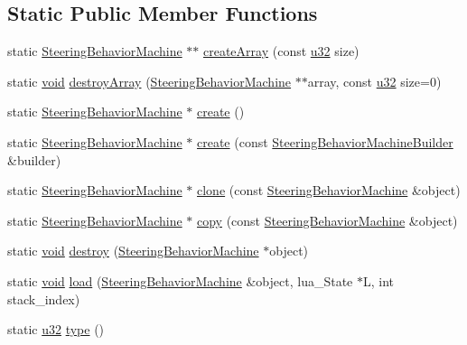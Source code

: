 \subsection*{Static Public Member Functions}
\begin{DoxyCompactItemize}
\item 
static \mbox{\hyperlink{classnjli_1_1_steering_behavior_machine}{Steering\+Behavior\+Machine}} $\ast$$\ast$ \mbox{\hyperlink{classnjli_1_1_steering_behavior_machine_af97628764337e956f6c6ffe1d21eff30}{create\+Array}} (const \mbox{\hyperlink{_util_8h_a10e94b422ef0c20dcdec20d31a1f5049}{u32}} size)
\item 
static \mbox{\hyperlink{_thread_8h_af1e856da2e658414cb2456cb6f7ebc66}{void}} \mbox{\hyperlink{classnjli_1_1_steering_behavior_machine_a9cf768db1c04513184ada83d420af23e}{destroy\+Array}} (\mbox{\hyperlink{classnjli_1_1_steering_behavior_machine}{Steering\+Behavior\+Machine}} $\ast$$\ast$array, const \mbox{\hyperlink{_util_8h_a10e94b422ef0c20dcdec20d31a1f5049}{u32}} size=0)
\item 
static \mbox{\hyperlink{classnjli_1_1_steering_behavior_machine}{Steering\+Behavior\+Machine}} $\ast$ \mbox{\hyperlink{classnjli_1_1_steering_behavior_machine_ab8fe4150d2324d83d50a413d35d16ae2}{create}} ()
\item 
static \mbox{\hyperlink{classnjli_1_1_steering_behavior_machine}{Steering\+Behavior\+Machine}} $\ast$ \mbox{\hyperlink{classnjli_1_1_steering_behavior_machine_a8c449bcdcb6b82b7258ad5e418d6c430}{create}} (const \mbox{\hyperlink{classnjli_1_1_steering_behavior_machine_builder}{Steering\+Behavior\+Machine\+Builder}} \&builder)
\item 
static \mbox{\hyperlink{classnjli_1_1_steering_behavior_machine}{Steering\+Behavior\+Machine}} $\ast$ \mbox{\hyperlink{classnjli_1_1_steering_behavior_machine_a2f36fb5b2930a51164b442b399b2e414}{clone}} (const \mbox{\hyperlink{classnjli_1_1_steering_behavior_machine}{Steering\+Behavior\+Machine}} \&object)
\item 
static \mbox{\hyperlink{classnjli_1_1_steering_behavior_machine}{Steering\+Behavior\+Machine}} $\ast$ \mbox{\hyperlink{classnjli_1_1_steering_behavior_machine_a63326be519b9ee6d77687f90c6304697}{copy}} (const \mbox{\hyperlink{classnjli_1_1_steering_behavior_machine}{Steering\+Behavior\+Machine}} \&object)
\item 
static \mbox{\hyperlink{_thread_8h_af1e856da2e658414cb2456cb6f7ebc66}{void}} \mbox{\hyperlink{classnjli_1_1_steering_behavior_machine_a7e50f455b9d1a543c98bcb463f312647}{destroy}} (\mbox{\hyperlink{classnjli_1_1_steering_behavior_machine}{Steering\+Behavior\+Machine}} $\ast$object)
\item 
static \mbox{\hyperlink{_thread_8h_af1e856da2e658414cb2456cb6f7ebc66}{void}} \mbox{\hyperlink{classnjli_1_1_steering_behavior_machine_a3826fef1020cad7acb80436f7c9a71bd}{load}} (\mbox{\hyperlink{classnjli_1_1_steering_behavior_machine}{Steering\+Behavior\+Machine}} \&object, lua\+\_\+\+State $\ast$L, int stack\+\_\+index)
\item 
static \mbox{\hyperlink{_util_8h_a10e94b422ef0c20dcdec20d31a1f5049}{u32}} \mbox{\hyperlink{classnjli_1_1_steering_behavior_machine_ab193f59f5f0a3ba81703678bd9b14e8b}{type}} ()
\end{DoxyCompactItemize}
